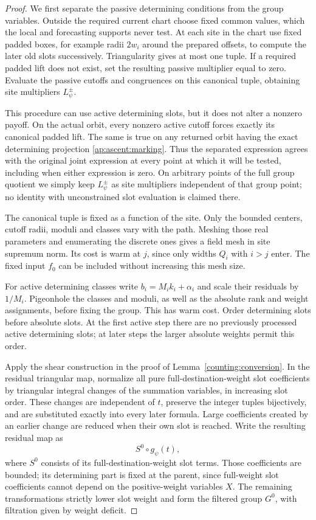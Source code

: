 \begin{proof}
We first separate the passive determining conditions from the group
variables.  Outside the required current chart choose fixed common
values, which the local and forecasting supports never test.
At each site in the chart use fixed padded boxes, for example radii
$2w_i$ around the prepared offsets, to compute the later old slots
successively.  Triangularity gives at most one tuple.  If a required
padded lift does not exist, set the resulting passive multiplier
equal to zero.  Evaluate the passive cutoffs and congruences on this
canonical tuple, obtaining site multipliers $L_\psi^\pm$.

This procedure can use active determining slots, but it does not
alter a nonzero payoff.  On the actual orbit, every nonzero active
cutoff forces exactly its canonical padded lift.  The same is true
on any returned orbit having the exact determining projection
\eqref{ap:ascent:marking}.  Thus the separated expression agrees
with the original joint expression at every point at which it will
be tested, including when either expression is zero.  On arbitrary
points of the full group quotient we simply keep $L_\psi^\pm$ as
site multipliers independent of that group point; no identity with
unconstrained slot evaluation is claimed there.

The canonical tuple is fixed as a function of the site.  Only the
bounded centers, cutoff radii, moduli and classes vary with the
path.  Meshing those real parameters and enumerating the discrete
ones gives a field mesh in site supremum norm.  Its cost is warm
at $j$, since only widths $Q_i$ with $i>j$ enter.  The fixed input
$f_0$ can be included without increasing this mesh size.

For active determining classes write
$b_i=M_i k_i+\alpha_i$ and scale their residuals by $1/M_i$.
Pigeonhole the classes and moduli, as well as the absolute rank and
weight assignments, before fixing the group.  This has warm cost.
Order determining slots before absolute slots.  At the first active
step there are no previously processed active determining slots;
at later steps the larger absolute weights permit this order.

Apply the shear construction in the proof of
Lemma~\ref{counting:conversion}.  In the residual triangular map,
normalize all pure full-destination-weight slot coefficients by
triangular integral changes of the summation variables, in increasing
slot order.  These changes are independent of $t$, preserve the
integer tuples bijectively, and are substituted exactly into every
later formula.  Large coefficients created by an earlier change
are reduced when their own slot is reached.  Write the resulting
residual map as
\[
                           S^0\circ g_\psi(t),
\]
where $S^0$ consists of its full-destination-weight slot terms.
Those coefficients are bounded; its determining part is fixed
at the parent, since full-weight slot coefficients cannot depend
on the positive-weight variables $X$.  The remaining transformations
strictly lower slot weight and form the filtered group $G^0$, with
filtration given by weight deficit.


\end{proof}
